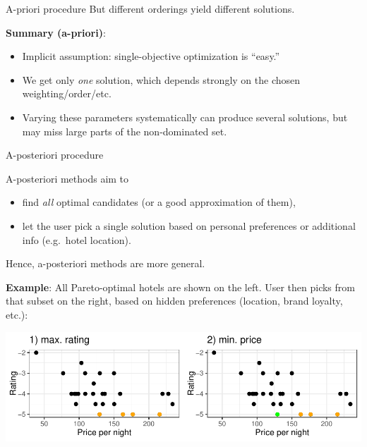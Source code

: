 \documentclass[11pt,compress,t,notes=noshow,xcolor=table]{beamer}
\begin{document}
\begin{vbframe}{A-priori procedure}
But different orderings yield different solutions.

{\footnotesize
\textbf{Summary (a-priori)}:
\vspace{-0.1cm}
\begin{itemize}\setlength{\itemsep}{0.7em}
\item Implicit assumption: single-objective optimization is “easy.”
\item We get only \emph{one} solution, which depends strongly on the chosen weighting/order/etc.
\item Varying these parameters systematically can produce several solutions, but may miss large parts of the non-dominated set.
\end{itemize}
}


\end{vbframe}

\begin{vbframe}{A-posteriori procedure}

{\footnotesize
A-posteriori methods aim to
\begin{itemize}
  \item find \emph{all} optimal candidates (or a good approximation of them),
  \item let the user pick a single solution based on personal preferences or 
        additional info (e.g.\ hotel location).
\end{itemize}
Hence, a-posteriori methods are more general.
}

{\footnotesize
\textbf{Example}: 
All Pareto-optimal hotels are shown on the left. 
User then picks from that subset on the right, based on hidden preferences 
(location, brand loyalty, etc.):
}
\begin{center}
\includegraphics[scale=0.8]{figure_man/expedia-11-1.pdf}
\end{center}

\end{vbframe}
\end{document}
